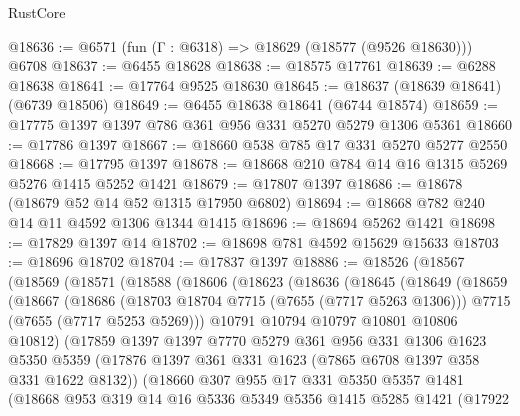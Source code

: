 \begin{lexlean}{RustCore}
\begin{coremodule}
@18636 := @6571 (fun (Γ : @6318) => @18629 (@18577 (@9526 @18630))) @6708
@18637 := @6455 @18628
@18638 := @18575 @17761
@18639 := @6288 @18638
@18641 := @17764 @9525 @18630
@18645 := @18637 (@18639 @18641) (@6739 @18506)
@18649 := @6455 @18638 @18641 (@6744 @18574)
@18659 := @17775 @1397 @1397 @786 @361 @956 @331 @5270 @5279 @1306 @5361
@18660 := @17786 @1397
@18667 := @18660 @538 @785 @17 @331 @5270 @5277 @2550
@18668 := @17795 @1397
@18678 := @18668 @210 @784 @14 @16 @1315 @5269 @5276 @1415 @5252 @1421
@18679 := @17807 @1397
@18686 := @18678 (@18679 @52 @14 @52 @1315 @17950 @6802)
@18694 := @18668 @782 @240 @14 @11 @4592 @1306 @1344 @1415
@18696 := @18694 @5262 @1421
@18698 := @17829 @1397 @14
@18702 := @18698 @781 @4592 @15629 @15633
@18703 := @18696 @18702
@18704 := @17837 @1397
@18886 := @18526
    (@18567
      (@18569
        (@18571
          (@18588
            (@18606
              (@18623
                (@18636
                  (@18645
                    (@18649
                      (@18659
                        (@18667
                          (@18686
                            (@18703 @18704 @7715 (@7655 (@7717 @5263 @1306)))
                            @7715
                            (@7655 (@7717 @5253 @5269)))
                          @10791
                          @10794
                          @10797
                          @10801
                          @10806
                          @10812)
                        (@17859
                          @1397
                          @1397
                          @7770
                          @5279
                          @361
                          @956
                          @331
                          @1306
                          @1623
                          @5350
                          @5359
                          (@17876 @1397 @361 @331 @1623 (@7865 @6708 @1397 @358 @331 @1622 @8132))
                          (@18660
                            @307
                            @955
                            @17
                            @331
                            @5350
                            @5357
                            @1481
                            (@18668
                              @953
                              @319
                              @14
                              @16
                              @5336
                              @5349
                              @5356
                              @1415
                              @5285
                              @1421
                              (@17922

\end{coremodule}
\end{lexlean}
